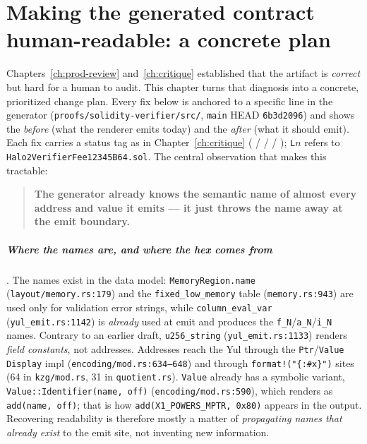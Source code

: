 \chapter{Making the generated contract human-readable: a concrete plan}
\label{ch:readability}

Chapters~\ref{ch:prod-review} and~\ref{ch:critique} established that the
artifact is \emph{correct} but hard for a human to audit. This chapter turns
that diagnosis into a concrete, prioritized change plan. Every fix below is
anchored to a specific line in the generator
(\texttt{proofs/\allowbreak{}solidity-verifier/\allowbreak{}src/\allowbreak{}}, \texttt{main} HEAD \texttt{6b3d2096})
and shows the
\emph{before} (what the renderer emits today) and the \emph{after} (what it
should emit). Each fix carries a status tag as in Chapter~\ref{ch:critique}
( /  /  /
); \texttt{L}$n$ refers to
\texttt{Halo2VerifierFee12345B64.sol}. The central observation that makes
this tractable:

\begin{quote}
\textbf{The generator already knows the semantic name of almost every
address and value it emits --- it just throws the name away at the emit
boundary.}
\end{quote}

\paragraph{Where the names are, and where the hex comes from}
. The names exist in the data model:
\texttt{MemoryRegion.name} (\texttt{layout/\allowbreak{}memory.rs:179}) and the
\texttt{fixed\_\allowbreak{}low\_\allowbreak{}memory} table (\texttt{memory.rs:943}) are used only for
validation error strings, while \texttt{column\_eval\_var}
(\texttt{yul\_emit.rs:1142}) is \emph{already} used at emit and produces the
\texttt{f\_N}/\texttt{a\_N}/\texttt{i\_N} names. Contrary to an earlier
draft, \texttt{u256\_string} (\texttt{yul\_emit.rs:1133}) renders
\emph{field constants}, not addresses. Addresses reach the Yul through the
\texttt{Ptr}/\texttt{Value} \texttt{Display} impl
(\texttt{encoding/\allowbreak{}mod.rs:634--648}) and through
\texttt{format!("\{:\#x\}")} sites (64 in \texttt{kzg/mod.rs}, 31 in
\texttt{quotient.rs}). \texttt{Value} already has a symbolic variant,
\texttt{Value::Identifier(name, off)} (\texttt{encoding/\allowbreak{}mod.rs:590}), which
renders as \texttt{add(name, off)}; that is how
\texttt{add(X1\_\allowbreak{}POWERS\_\allowbreak{}MPTR, 0x80)} appears in the output. Recovering
readability is therefore mostly a matter of \emph{propagating names that
already exist} to the emit site, not inventing new information.

